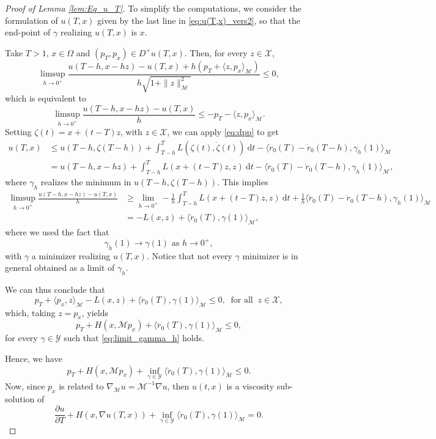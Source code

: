 \documentclass[10pt,a4paper]{amsart}
\newcommand{\ud}{\mathrm{d}}
\begin{document}
    \begin{proof}[Proof of Lemma \ref{lem:Eq_u_T}]
To simplify the computations, we consider the formulation of $u(T,x)$ given by the last line in \eqref{eq:u(T,x)_vers2}, so that the end-point of $\gamma$ realizing $u(T,x)$ is $x$.

\smallskip
Take $T>1$, $x\in\Omega$ and $(p_T,p_x)\in D^+ u(T,x)$. Then, for every $z\in\mathcal{X}$, 
\[
\limsup_{h\rightarrow0^+}\frac{u(T-h,x-hz)-u(T,x) + h(p_T + \langle z,p_x\rangle_\mathcal{M})}{h\sqrt{1+\|z\|_\mathcal{M}^2}}\leq 0,
\]
which is equivalent to
\[
\limsup_{h\rightarrow0^+}\frac{u(T-h,x-hz)-u(T,x)}{h}\leq -p_T - \langle z,p_x\rangle_\mathcal{M}.
\]
Setting $\zeta(t) = x + (t-T)z$, with $z\in\mathcal{X}$, we can apply \eqref{eq:dpp} to get
\[
\begin{split}
    u(T,x) &\leq u(T-h,\zeta(T-h)) + \int_{T-h}^{T}L(\zeta(t),\dot{\zeta}(t))\ \ud t - \langle \dot{r}_0(T)-\dot{r}_0(T-h),\gamma_h(1)\rangle_\mathcal{M}\\
    &=u(T-h,x-hz) + \int_{T-h}^{T}L(x+(t-T)z,z)\ \ud t - \langle \dot{r}_0(T)-\dot{r}_0(T-h),\gamma_h(1)\rangle_\mathcal{M},
\end{split}
\]
where $\gamma_h$ realizes the minimum in $u(T-h,\zeta(T-h))$. This implies
\[
\begin{split}
    \limsup_{h\rightarrow 0^+} \frac{u(T-h,x-hz)-u(T,x)}{h} &\geq \lim_{h\rightarrow0^+} -\frac{1}{h} \int_{T-h}^{T}L(x+(t-T)z,z)\ \ud t + \frac{1}{h} \langle \dot{r}_0(T)-\dot{r}_0(T-h),
{\gamma_h}(1)\rangle_\mathcal{M}\\
    &= -L(x,z) + \langle \ddot{r}_0(T),\gamma(1)\rangle_\mathcal{M},
\end{split}
\]
where we used the fact that 
\begin{equation}\label{eq:limit_gamma_h}
    \gamma_h(1)\rightarrow\gamma(1)\text{ as }h\rightarrow0^+,
\end{equation}
with $\gamma$ a minimizer realizing $u(T,x)$. Notice that not every $\gamma$ minimizer is in general obtained as a limit of $\gamma_h$.

\smallskip
We can thus conclude that 
\[
p_T + \langle p_x,z \rangle_\mathcal{M} - L(x,z) + \langle \ddot{r}_0(T),\gamma(1)\rangle_\mathcal{M} \leq 0, \ \mbox{ for all } \ z \in \mathcal X,
\]
which, taking $z=p_x$, yields 
\[
p_T + H(x,\mathcal M p_x) + \langle \ddot{r}_0(T),\gamma(1)\rangle_\mathcal{M} \leq 0,
\]
for every $\gamma \in \mathcal Y$ such that \eqref{eq:limit_gamma_h} holds.


Hence, we have 
\[
p_T + H(x,\mathcal M p_x) + \inf_{\gamma\in\mathcal Y}\langle \ddot{r}_0(T),\gamma(1)\rangle_\mathcal{M} \leq 0.
\]
Now, since $p_x$ is related to $\nabla_{\mathcal M} u = \mathcal M^{-1} \nabla u$, then $u(t,x)$ is a viscosity sub-solution of
\[
\frac{\partial u}{\partial T} +H(x,{\nabla u(T,x)})+\inf_{\gamma\in \mathcal{Y}} \langle \ddot{r}_0(T), \gamma(1)\rangle_{\mathcal M} =0.
\]


\end{proof}
\end{document}
